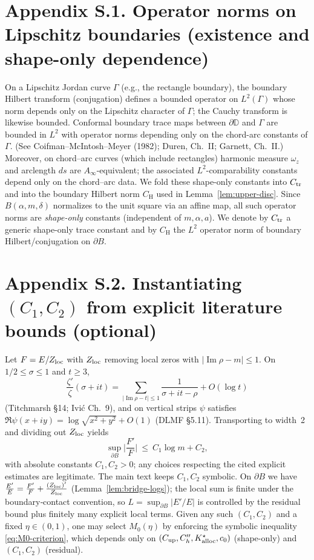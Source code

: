 \documentclass[11pt]{article}
\numberwithin{equation}{section}
\theoremstyle{remark}
\newcommand{\D}{\mathbb{D}}
\DeclareMathOperator{\Imag}{Im}
\begin{document}
\section*{Appendix S.1. Operator norms on Lipschitz boundaries (existence and shape-only dependence)}\label{app:S1} %
On a Lipschitz Jordan curve $\Gamma$ (e.g., the rectangle boundary), the boundary Hilbert transform (conjugation) defines a bounded operator on $L^2(\Gamma)$ whose norm depends only on the Lipschitz character of $\Gamma$; the Cauchy transform is likewise bounded. Conformal boundary trace maps between $\partial\D$ and $\Gamma$ are bounded in $L^2$ with operator norms depending only on the chord-arc constants of $\Gamma$. (See Coifman--McIntosh--Meyer (1982); Duren, Ch.~II; Garnett, Ch.~II.) %
Moreover, on chord–arc curves (which include rectangles) harmonic measure $\omega_z$ and arclength $ds$ are $A_\infty$-equivalent; the associated $L^2$-comparability constants depend only on the chord–arc data. We fold these shape-only constants into $C_{\rm tr}$ and into the boundary Hilbert norm $C_{\mathrm H}$ used in Lemma~\ref{lem:upper-disc}. %
Since $B(\alpha,m,\delta)$ normalizes to the unit square via an affine map, all such operator norms are \emph{shape-only} constants (independent of $m,\alpha,a$). We denote by $C_{\rm tr}$ a generic shape-only trace constant and by $C_{\mathrm H}$ the $L^2$ operator norm of boundary Hilbert/conjugation on $\partial B$.

\section*{Appendix S.2. Instantiating $(C_1,C_2)$ from explicit literature bounds (optional)}\label{app:S2} %
Let $F=E/Z_{\rm loc}$ with $Z_{\rm loc}$ removing local zeros with $|\Imag\rho-m|\le 1$. On $1/2\le\sigma\le 1$ and $t\ge 3$,
\[
\frac{\zeta'}{\zeta}(\sigma+it)=\sum_{|\Imag\rho-t|\le 1}\frac{1}{\sigma+it-\rho}+O(\log t)
\]
(Titchmarsh §14; Ivi\'c Ch.~9), and on vertical strips $\psi$ satisfies $\Re\psi(x+iy)=\log\sqrt{x^2+y^2}+O(1)$ (DLMF §5.11). Transporting to width~2 and dividing out $Z_{\rm loc}$ yields
\[
\sup_{\partial B}\Big|\frac{F'}{F}\Big|\ \le\ C_1\log m + C_2,
\]
with absolute constants $C_1,C_2>0$; any choices respecting the cited explicit estimates are legitimate. The main text keeps $C_1,C_2$ symbolic.
On $\partial B$ we have $\frac{E'}{E}=\frac{F'}{F}+\frac{(Z_{\rm loc})'}{Z_{\rm loc}}$ (Lemma~\ref{lem:bridge-logs}); the local sum is finite under the boundary‑contact convention, so $L=\sup_{\partial B}|E'/E|$ is controlled by the residual bound plus finitely many explicit local terms.
Given any such $(C_1,C_2)$ and a fixed $\eta\in(0,1)$, one may select $M_0(\eta)$ by enforcing the symbolic inequality \eqref{eq:M0-criterion}, which depends only on $(C_{\mathrm{up}},C_h'',K_{\rm alloc}^{\star},c_0)$ (shape-only) and $(C_1,C_2)$ (residual). %
\end{document}
